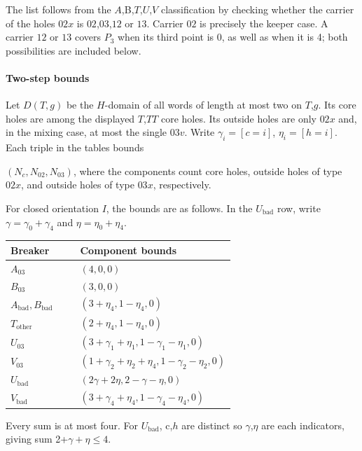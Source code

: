 \documentclass[11pt]{article}
\theoremstyle{definition}
\theoremstyle{plain}
\begin{document}
The list follows from the \(A\),B,\(T\),\(U\),\(V\) classification by
checking whether the carrier of the holes \(02x\) is \(02\),\(03\),\(12\) or \(13\).
Carrier \(02\) is precisely the keeper case. A carrier \(12\)
or \(13\) covers \(P_{3}\) when its third point is 0, as well as when
it is 4; both possibilities are included below.

\paragraph{Two-step bounds}\label{uniform-two-step-counting-table}

Let \(D(T,g)\) be the \(H\)-domain of all words of length at most two on
\(T\),\(g\). Its core holes are among the displayed \(T\),\(TT\) core holes.
Its outside holes are only \(02x\) and, in the mixing case, at most the
single \(03v\). Write \(\gamma_i=[c=i]\), \(\eta_i=[h=i]\). Each
triple in the tables bounds

\((N_c,N_{02},N_{03})\), where the components count core holes, outside holes of type \(02x\), and outside holes of type \(03x\), respectively.

For closed orientation \(I\), the bounds are as follows. In the \(U_{\mathrm{bad}}\) row, write \(\gamma=\gamma_0+\gamma_4\) and \(\eta=\eta_0+\eta_4\).

\begin{center}
\begin{tabular}{lp{0.69\linewidth}}
\toprule
Breaker
 & Component bounds
 \\
\midrule

\(A_{03}\) & \((4,0,0)\)\\
\(B_{03}\) & \((3,0,0)\)\\
\(A_{\mathrm{bad}}, B_{\mathrm{bad}}\) & \((3+\eta_{4},1-\eta_{4},0)\)\\
\(T_{\mathrm{other}}\) & \((2+\eta_{4},1-\eta_{4},0)\)\\
\(U_{03}\) & \((3+\gamma_{1}+\eta_{1},1-\gamma_{1}-\eta_{1},0)\)\\
\(V_{03}\) & \((1+\gamma_{2}+\eta_{2}+\eta_{4},1-\gamma_{2}-\eta_{2},0)\)\\
\(U_{\mathrm{bad}}\) & \((2\gamma+2\eta,2-\gamma-\eta,0)\)\\
\(V_{\mathrm{bad}}\) & \((3+\gamma_{4}+\eta_{4},1-\gamma_{4}-\eta_{4},0)\)\\
\bottomrule
\end{tabular}
\end{center}

Every sum is at most four. For \(U_{\mathrm{bad}}\), c,\(h\) are distinct so
\(\gamma\),\(\eta\) are each indicators, giving sum 2+\(\gamma+\eta\le 4\).
\end{document}

